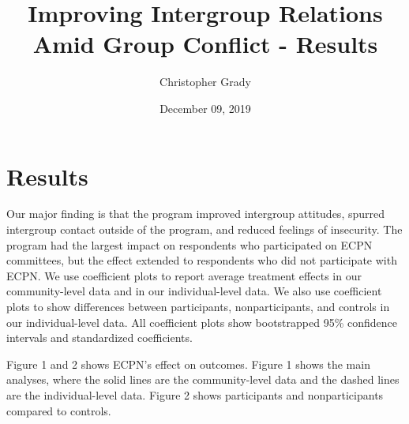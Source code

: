 \documentclass[]{article}
\title{Improving Intergroup Relations Amid Group Conflict - Results}
\author{Christopher Grady}
\date{December 09, 2019}
\begin{document}
\maketitle

\hypertarget{results}{%
\section{Results}\label{results}}

Our major finding is that the program improved intergroup attitudes,
spurred intergroup contact outside of the program, and reduced feelings
of insecurity. The program had the largest impact on respondents who
participated on ECPN committees, but the effect extended to respondents
who did not participate with ECPN. We use coefficient plots to report
average treatment effects in our community-level data and in our
individual-level data. We also use coefficient plots to show differences
between participants, nonparticipants, and controls in our
individual-level data. All coefficient plots show bootstrapped 95\%
confidence intervals and standardized coefficients.

Figure 1 and 2 shows ECPN's effect on outcomes. Figure 1 shows the main
analyses, where the solid lines are the community-level data and the
dashed lines are the individual-level data. Figure 2 shows participants
and nonparticipants compared to controls.
\end{document}
